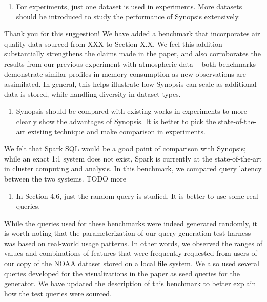 \documentclass{article}
\begin{document}
\begin{enumerate}
\def\labelenumi{\arabic{enumi})}
\setcounter{enumi}{2}
\item
  For experiments, just one dataset is used in experiments. More
  datasets should be introduced to study the performance of Synopsis
  extensively.
\end{enumerate}

\begin{tcolorbox}
Thank you for this suggestion! We have added a benchmark that
incorporates air quality data sourced from XXX to Section X.X. We feel
this addition substantially strengthens the claims made in the paper,
and also corroborates the results from our previous experiment with
atmospheric data -- both benchmarks demonstrate similar profiles in
memory consumption as new observations are assimilated. In general, this
helps illustrate how Synopsis can scale as additional data is stored,
while handling diversity in dataset types.
\end{tcolorbox}

\begin{enumerate}
\def\labelenumi{\arabic{enumi})}
\setcounter{enumi}{3}
\item
  Synopsis should be compared with existing works in experiments to more
  clearly show the advantages of Synopsis. It is better to pick the
  state-of-the-art existing technique and make comparison in
  experiments.
\end{enumerate}

\begin{tcolorbox}
We felt that Spark SQL would be a good point of comparison with
Synopsis; while an exact 1:1 system does not exist, Spark is currently
at the state-of-the-art in cluster computing and analysis. In this
benchmark, we compared query latency between the two systems. TODO more
\end{tcolorbox}

\begin{enumerate}
\def\labelenumi{\arabic{enumi})}
\setcounter{enumi}{4}
\item
  In Section 4.6, just the random query is studied. It is better to use
  some real queries.
\end{enumerate}

\begin{tcolorbox}
While the queries used for these benchmarks were indeed generated randomly, it is worth noting that the parameterization of our query generation test harness was based on real-world usage patterns. In other words, we observed the ranges of values and combinations of features that were frequently requested from users of our copy of the NOAA dataset stored on a local file system. We also used several queries developed for the visualizations in the paper as seed queries for the generator. We have updated the description of this benchmark to better explain how the test queries were sourced.
\end{tcolorbox}
\end{document}
